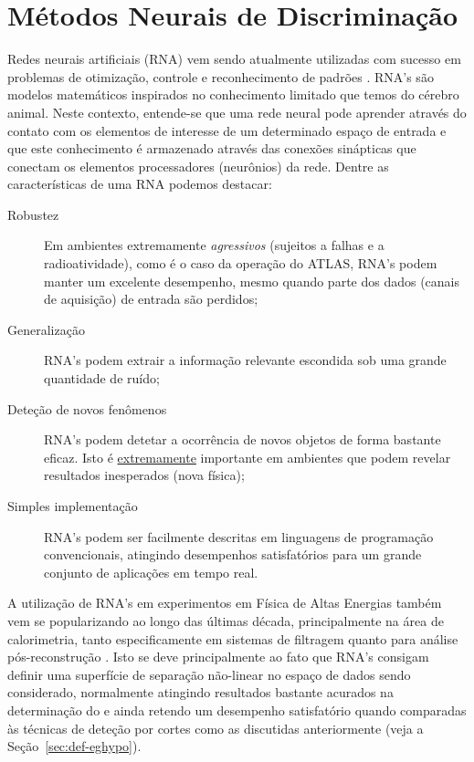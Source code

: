 \section{Métodos Neurais de Discriminação}
\label{sec:neural}

Redes neurais artificiais (RNA) vem sendo atualmente utilizadas com sucesso em
problemas de otimização, controle e reconhecimento de padrões
\cite{haykin}. RNA's são modelos matemáticos inspirados no conhecimento
limitado que temos do cérebro animal. Neste contexto, entende-se que uma rede
neural pode aprender através do contato com os elementos de interesse de um
determinado espaço de entrada e que este conhecimento é armazenado através das
conexões sinápticas que conectam os elementos processadores (neurônios) da
rede. Dentre as características de uma RNA podemos destacar:

\begin{description}
\item[Robustez] Em ambientes extremamente \emph{agressivos} (sujeitos a falhas
e a radioatividade), como é o caso da operação do ATLAS, RNA's podem manter um
excelente desempenho, mesmo quando parte dos dados (canais de aquisição) de
entrada são perdidos;

\item[Generalização] RNA's podem extrair a informação relevante escondida sob
uma grande quantidade de ruído;

\item[Deteção de novos fenômenos] RNA's podem detetar a ocorrência de novos
objetos de forma bastante eficaz. Isto é \underline{extremamente} importante
em ambientes que podem revelar resultados inesperados (nova física);

\item[Simples implementação] RNA's podem ser facilmente descritas em
linguagens de programação convencionais, atingindo desempenhos satisfatórios
para um grande conjunto de aplicações em tempo real.
\end{description}

A utilização de RNA's em experimentos em Física de Altas Energias também vem
se popularizando ao longo das últimas década, principalmente na área de
calorimetria, tanto especificamente em sistemas de filtragem \cite{badgett92,
koehne96} quanto para análise pós-reconstrução \cite{altherr90}. Isto se deve
principalmente ao fato que RNA's consigam definir uma superfície de separação
não-linear no espaço de dados sendo considerado, normalmente atingindo
resultados bastante acurados na determinação do  e ainda
retendo um desempenho satisfatório quando comparadas às técnicas de deteção
por cortes como as discutidas anteriormente (veja a
Seção~\ref{sec:def-eghypo}).

